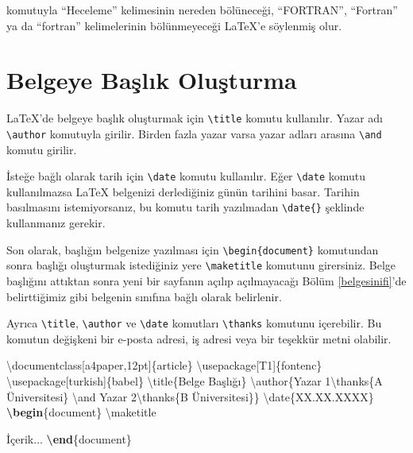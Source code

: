 \documentclass[
  10pt,
]{scrbook}
\newenvironment{Shaded}{\begin{snugshade}}{\end{snugshade}}
\newcommand{\BuiltInTok}[1]{#1}
\newcommand{\ExtensionTok}[1]{#1}
\newcommand{\FunctionTok}[1]{\textcolor[rgb]{0.00,0.00,0.00}{#1}}
\newcommand{\KeywordTok}[1]{\textcolor[rgb]{0.13,0.29,0.53}{\textbf{#1}}}
\newcommand{\NormalTok}[1]{#1}
\theoremstyle{definition}
\theoremstyle{definition}
\theoremstyle{definition}
\theoremstyle{definition}
\theoremstyle{remark}
\begin{document}
komutuyla ``Heceleme'' kelimesinin nereden bölüneceği, ``FORTRAN'', ``Fortran'' ya da ``fortran'' kelimelerinin bölünmeyeceği LaTeX'e söylenmiş olur.

\hypertarget{belgeye-baux15flux131k-oluux15fturma}{%
\section{Belgeye Başlık Oluşturma}\label{belgeye-baux15flux131k-oluux15fturma}}

LaTeX'de belgeye başlık oluşturmak için \texttt{\textbackslash{}title} komutu kullanılır. Yazar adı \texttt{\textbackslash{}author} komutuyla girilir. Birden fazla yazar varsa yazar adları arasına \texttt{\textbackslash{}and} komutu girilir.

İsteğe bağlı olarak tarih için \texttt{\textbackslash{}date} komutu kullanılır. Eğer \texttt{\textbackslash{}date} komutu kullanılmazsa LaTeX belgenizi derlediğiniz günün tarihini basar. Tarihin basılmasını istemiyorsanız, bu komutu tarih yazılmadan \texttt{\textbackslash{}date\{\}} şeklinde kullanmanız gerekir.

Son olarak, başlığın belgenize yazılması için \texttt{\textbackslash{}begin\{document\}} komutundan sonra başlığı oluşturmak istediğiniz yere \texttt{\textbackslash{}maketitle} komutunu girersiniz. Belge başlığını attıktan sonra yeni bir sayfanın açılıp açılmayacağı Bölüm \ref{belgesinifi}'de belirttiğimiz gibi belgenin sınıfına bağlı olarak belirlenir.

Ayrıca \texttt{\textbackslash{}title}, \texttt{\textbackslash{}author} ve \texttt{\textbackslash{}date} komutları \texttt{\textbackslash{}thanks} komutunu içerebilir. Bu komutun değişkeni bir e-posta adresi, iş adresi veya bir teşekkür metni olabilir.

\begin{Shaded}
\begin{Highlighting}[]
\BuiltInTok{\textbackslash{}documentclass}\NormalTok{[a4paper,12pt]\{}\ExtensionTok{article}\NormalTok{\}}
\BuiltInTok{\textbackslash{}usepackage}\NormalTok{[T1]\{}\ExtensionTok{fontenc}\NormalTok{\}}
\BuiltInTok{\textbackslash{}usepackage}\NormalTok{[turkish]\{}\ExtensionTok{babel}\NormalTok{\}}
\FunctionTok{\textbackslash{}title}\NormalTok{\{Belge Başlığı\}}
\FunctionTok{\textbackslash{}author}\NormalTok{\{Yazar 1}\FunctionTok{\textbackslash{}thanks}\NormalTok{\{A Üniversitesi\} }\FunctionTok{\textbackslash{}and}\NormalTok{ Yazar 2}\FunctionTok{\textbackslash{}thanks}\NormalTok{\{B Üniversitesi\}\}}
\FunctionTok{\textbackslash{}date}\NormalTok{\{XX.XX.XXXX\}}
\KeywordTok{\textbackslash{}begin}\NormalTok{\{}\ExtensionTok{document}\NormalTok{\}}
\FunctionTok{\textbackslash{}maketitle}

\NormalTok{  İçerik...}
\KeywordTok{\textbackslash{}end}\NormalTok{\{}\ExtensionTok{document}\NormalTok{\}}
\end{Highlighting}
\end{Shaded}
\end{document}
